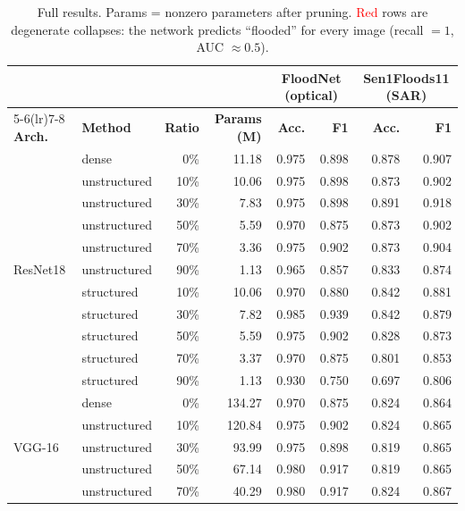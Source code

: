 \documentclass[11pt]{article}
\begin{document}
\begin{table}[h]
\centering
\caption{Full results. Params = nonzero parameters after pruning.
\textcolor{red}{Red} rows are degenerate collapses: the network predicts
``flooded'' for every image (recall $=1$, AUC $\approx 0.5$).}
\footnotesize
\begin{tabular}{llrr rr @{\hspace{1.4em}} rr}
\toprule
& & \multicolumn{2}{c}{} & \multicolumn{2}{c}{\textbf{FloodNet (optical)}} & \multicolumn{2}{c}{\textbf{Sen1Floods11 (SAR)}}\\
\cmidrule(lr){5-6}\cmidrule(lr){7-8}
\textbf{Arch.} & \textbf{Method} & \textbf{Ratio} & \textbf{Params (M)} & \textbf{Acc.} & \textbf{F1} & \textbf{Acc.} & \textbf{F1}\\
\midrule
\multirow{11}{*}{ResNet18}
 & dense        & 0\%  & 11.18 & 0.975 & 0.898 & 0.878 & 0.907\\
\cmidrule(lr){2-8}
 & unstructured & 10\% & 10.06 & 0.975 & 0.898 & 0.873 & 0.902\\
 & unstructured & 30\% &  7.83 & 0.975 & 0.898 & 0.891 & 0.918\\
 & unstructured & 50\% &  5.59 & 0.970 & 0.875 & 0.873 & 0.902\\
 & unstructured & 70\% &  3.36 & 0.975 & 0.902 & 0.873 & 0.904\\
 & unstructured & 90\% &  1.13 & 0.965 & 0.857 & 0.833 & 0.874\\
\cmidrule(lr){2-8}
 & structured   & 10\% & 10.06 & 0.970 & 0.880 & 0.842 & 0.881\\
 & structured   & 30\% &  7.82 & 0.985 & 0.939 & 0.842 & 0.879\\
 & structured   & 50\% &  5.59 & 0.975 & 0.902 & 0.828 & 0.873\\
 & structured   & 70\% &  3.37 & 0.970 & 0.875 & 0.801 & 0.853\\
 & structured   & 90\% &  1.13 & 0.930 & 0.750 & 0.697 & 0.806\\
\midrule
\multirow{11}{*}{VGG-16}
 & dense        & 0\%  & 134.27 & 0.970 & 0.875 & 0.824 & 0.864\\
\cmidrule(lr){2-8}
 & unstructured & 10\% & 120.84 & 0.975 & 0.902 & 0.824 & 0.865\\
 & unstructured & 30\% &  93.99 & 0.975 & 0.898 & 0.819 & 0.865\\
 & unstructured & 50\% &  67.14 & 0.980 & 0.917 & 0.819 & 0.865\\
 & unstructured & 70\% &  40.29 & 0.980 & 0.917 & 0.824 & 0.867\\

\end{tabular}
\end{table}
\end{document}
